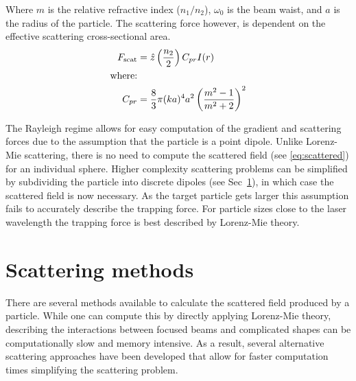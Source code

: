 Where $m$ is the relative refractive index ($n_1/n_2$), $\omega_0$ is 
the beam waist, and $a$ is the radius of the particle. The scattering force 
however, is dependent on the effective scattering cross-sectional area. 
\begin{align}
  F_{\rm scat}
  &= \hat{z} \left(\frac{n_2}{2}\right) C_{pr} I(r) \\
  \text{where:} \nonumber \\
  C_{pr} &= \frac{8}{3} \pi (ka)^4 a^2 \left(\frac{m^2-1}{m^2+2}\right)^2
\end{align}

The Rayleigh regime allows for easy computation of the gradient and 
scattering forces due to the assumption that the particle is a point 
dipole. Unlike Lorenz-Mie scattering, there is no need to compute the 
scattered field (see \eqref{eq:scattered}) for an individual sphere. 
Higher complexity scattering problems can be simplified by subdividing 
the particle into discrete dipoles (see Sec~\ref{sec:scattering}), 
in which case the scattered field is now necessary. As the target 
particle gets larger this assumption fails to accurately describe 
the trapping force. For particle sizes close to the laser wavelength 
the trapping force is best described by Lorenz-Mie theory. 

\section{Scattering methods}
\label{sec:scattering}
There are several methods available to calculate the scattered field 
produced by a particle. While one can compute this by directly applying
Lorenz-Mie theory, describing the interactions between focused beams and 
complicated shapes can be computationally slow and memory intensive. As a
result, several alternative scattering approaches have been developed that
allow for faster computation times simplifying the scattering problem.
